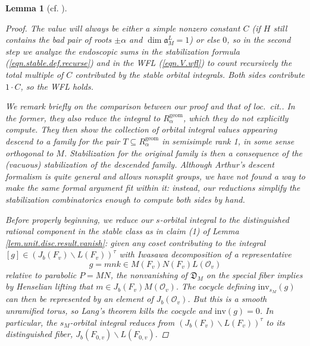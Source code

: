 \documentclass[openany]{amsbook}
\newtheorem{lemma}[theorem]{Lemma}
\theoremstyle{definition}
\theoremstyle{remark}
\numberwithin{equation}{section}
\renewcommand{\O}{\mathcal{O}}
\renewcommand{\-}{\operatorname{-}}
\renewcommand{\a}{\mathfrak{a}}
\newcommand{\on}[1]{\operatorname{#1}}
\newcommand{\fD}{\mathfrak{D}}
\newcommand{\inv}{\mathrm{inv}}
\begin{document}
\begin{lemma}[{cf. \cite[Lemme 17.6.2, Lemme 17.8.1]{CLII}}]
\begin{proof}
        The value will always be either a simple nonzero constant $C$ (if $H$ still contains the bad pair of roots $\pm\alpha$ and $\dim \a_M^L = 1$) or else $0$, so in the second step we analyze the endoscopic sums in the stabilization formula (\ref{eqn.stable.def.recurse}) and in the WFL (\ref{eqn.V.wfl}) to count recursively the total multiple of $C$ contributed by the stable orbital integrals. Both sides contribute $1 \cdot C$, so the WFL holds. 
        
        We remark briefly on the comparison between our proof and that of \textit{loc.\ cit.}. In the former, they also reduce the integral to $R_\alpha^{\on{geom}}$, which they do not explicitly compute. They then show the collection of orbital integral values appearing descend to a family for the pair $T \subseteq R_\alpha^{\on{geom}}$ in semisimple rank 1, in some sense orthogonal to $M$. Stabilization for the original family is then a consequence of the (vacuous) stabilization of the descended family. Although Arthur's descent formalism is quite general and allows nonsplit groups, we have not found a way to make the same formal argument fit within it: instead, our reductions simplify the stabilization combinatorics enough to compute both sides by hand.

        Before properly beginning, we reduce our $s$-orbital integral to the distinguished rational component in the stable class as in claim (1) of Lemma \ref{lem.unit.disc.result.vanish}: given any coset contributing to the integral $[g] \in (J_b(F_v) \backslash L(F_v))^{\tau}$ with Iwasawa decomposition of a representative
        $$
            g = mnk \in M(F_v) N(F_v) L(\O_{v})
        $$
        relative to parabolic $P = MN$, the nonvanishing of $\fD_M$ on the special fiber implies by Henselian lifting that $m \in J_b(F_v) M(\O_v)$. The cocycle defining $\inv_{s_M}(g)$ can then be represented by an element of $J_b(\O_v)$. But this is a smooth unramified torus, so Lang's theorem kills the cocycle and $\inv(g) = 0$. In particular, the $s_M$-orbital integral reduces from $(J_b(F_v) \backslash L(F_v))^{\tau}$ to its distinguished fiber, $J_b(F_{0,v}) \backslash L(F_{0,v})$.


\end{proof}
\end{lemma}
\end{document}
